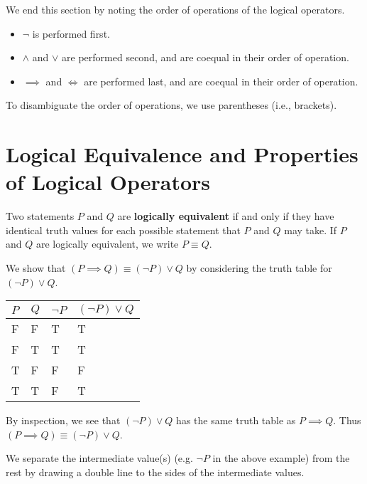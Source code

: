 We end this section by noting the order of operations of the logical operators.
\begin{itemize}
    \item $\lnot$ is performed first.
    \item $\land$ and $\lor$ are performed second, and are coequal in their order of operation.
    \item $\implies$ and $\iff$ are performed last, and are coequal in their order of operation.
\end{itemize}
To disambiguate the order of operations, we use parentheses (i.e., brackets).

\newpage

\section{Logical Equivalence and Properties of Logical Operators}
\begin{definition}
    Two statements $P$ and $Q$ are \textbf{logically equivalent} if and only if they have identical truth values for each possible statement that $P$ and $Q$ may take. If $P$ and $Q$ are logically equivalent, we write $P \equiv Q$.
\end{definition}
\begin{example}
    We show that $(P \implies Q) \equiv (\lnot P) \lor Q$ by considering the truth table for $(\lnot P) \lor Q$.
    \begin{table}[h]
        \centering
        \begin{tabular}{|l|l||l||l|}
            \hline
            $P$ & $Q$ & $\lnot P$ & $(\lnot P) \lor Q$ \\ \hline
            F   & F   & T         & T                  \\ \hline
            F   & T   & T         & T                  \\ \hline
            T   & F   & F         & F                  \\ \hline
            T   & T   & F         & T                  \\ \hline
        \end{tabular}
    \end{table}

    By inspection, we see that $(\lnot P) \lor Q$ has the same truth table as $P \implies Q$. Thus $(P \implies Q) \equiv (\lnot P) \lor Q$.
\end{example}
\begin{remark}
    We separate the intermediate value(s) (e.g. $\lnot P$ in the above example) from the rest by drawing a double line to the sides of the intermediate values.
\end{remark}

